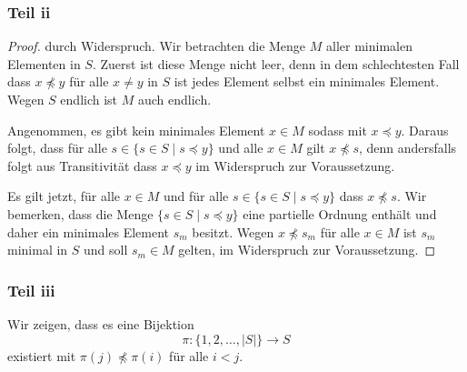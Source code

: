 \documentclass[a5paper]{article}
\providecommand{\abs}[1]{\left\lvert#1\right\rvert}
\newcommand{\npreceq}{\npreccurlyeq}
\theoremstyle{remark}
\begin{document}
\subsubsection{Teil ii}
\begin{proof}
  durch Widerspruch.  Wir betrachten die Menge \(M\) aller minimalen
  Elementen in \(S\).  Zuerst ist diese Menge nicht leer, denn in dem
  schlechtesten Fall dass \(x \npreceq y\) für alle \(x \ne y\) in \(S\) ist jedes
  Element selbst ein minimales Element.  Wegen \(S\) endlich ist \(M\)
  auch endlich.

  Angenommen, es gibt kein minimales Element \(x \in M\)  sodass mit \(x
  \preceq y\).  Daraus folgt, dass für alle \(s \in \{s \in S \mid s \preceq y\}\) und alle
  \(x \in M\) gilt \(x \npreceq s\), denn andersfalls folgt aus Transitivität dass
  \(x \preceq y\) im Widerspruch zur Voraussetzung.

  Es gilt jetzt, für alle \(x \in M\) und für alle \(s \in \{s \in S \mid s
  \preceq y\}\) dass \(x \npreceq s\).  Wir bemerken, dass die Menge \(\{s \in S \mid s
  \preceq y\}\) eine partielle Ordnung enthält und daher ein minimales
  Element \(s_{m}\) besitzt.  Wegen \(x \npreceq s_{m}\) für alle \(x \in M\) ist
  \(s_{m}\) minimal in \(S\) und soll \(s_{m} \in M\) gelten, im Widerspruch
  zur Voraussetzung.
\end{proof}
\subsubsection{Teil iii}
  Wir zeigen, dass es eine Bijektion
  \[\pi\colon \{1, 2, \ldots, \abs{S}\} \to S\]
  existiert mit \(\pi(j) \npreceq \pi(i)\) für alle \(i < j\).
\end{document}
